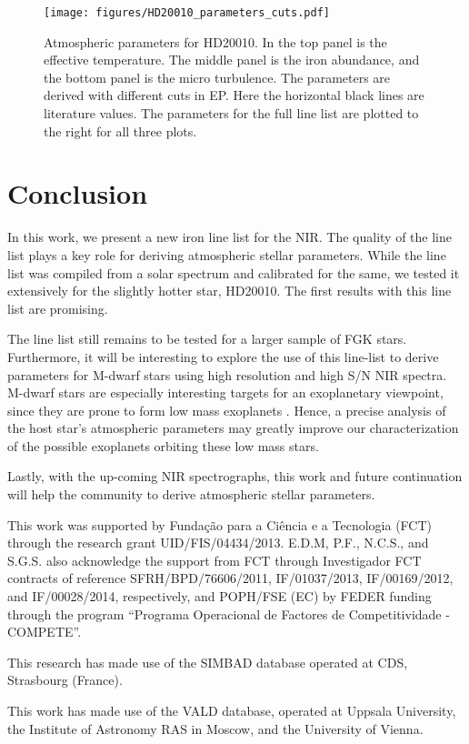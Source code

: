 \documentclass{aa}
\begin{document}
\begin{figure}[tpb!]
    \centering
    \texttt{[image: figures/HD20010\_parameters\_cuts.pdf]}
    \caption{Atmospheric parameters for HD20010. In the top panel is
    the effective temperature. The middle panel is the iron abundance,
    and the bottom panel is the micro turbulence. The parameters are
    derived with different cuts in EP. Here the horizontal black lines
    are literature values. The parameters for the full line list are
    plotted to the right for all three plots.}
    \label{fig:HD20010_parameters_cuts}
\end{figure}




\section{Conclusion}

In this work, we present a new iron line list for the NIR. The quality
of the line list plays a key role for deriving atmospheric stellar
parameters. While the line list was compiled from a solar spectrum and
calibrated for the same, we tested it extensively for the slightly
hotter star, HD20010. The first results with this line list are
promising.

The line list still remains to be tested for a larger sample of FGK
stars. Furthermore, it will be interesting to explore the use of this
line-list to derive parameters for M-dwarf stars using high resolution
and high S/N NIR spectra. M-dwarf stars are especially interesting
targets for an exoplanetary viewpoint, since they are prone to form low
mass exoplanets \citep{Bonfils2013}. Hence, a precise analysis of the
host star's atmospheric parameters may greatly improve our characterization
of the possible exoplanets orbiting these low mass stars.

Lastly, with the up-coming NIR spectrographs, this work and future
continuation will help the community to derive atmospheric stellar
parameters.





\begin{acknowledgements}

This work was supported by Funda\c{c}\~ao para a Ci\^encia e a
Tecnologia (FCT) through the research grant UID/FIS/04434/2013.
E.D.M, P.F., N.C.S., and S.G.S. also acknowledge the support from FCT
through Investigador FCT contracts of reference SFRH/BPD/76606/2011,
IF/01037/2013, IF/00169/2012, and IF/00028/2014, respectively, and
POPH/FSE (EC) by FEDER funding through the program “Programa
Operacional de Factores de Competitividade - COMPETE”.

This research has made use of the SIMBAD database operated at CDS,
Strasbourg (France).

This work has made use of the VALD database, operated at Uppsala University,
the Institute of Astronomy RAS in Moscow, and the University of Vienna.

\end{acknowledgements}








\end{document}

